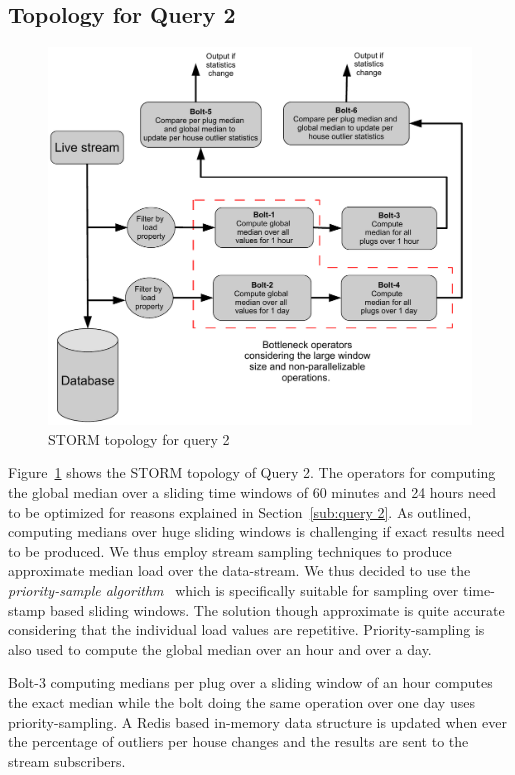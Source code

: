 \documentclass{sig-alternate}
\begin{document}
\subsection{Topology for Query 2}
\label{sub:q2-topology}  
\begin{figure}[htbp]
\includegraphics[scale=0.393]{query2.pdf}
\caption{STORM topology for query 2}
\label{fig:q2-topo}
\end{figure}

 Figure~\ref{fig:q2-topo} shows the STORM topology of Query 2. The operators for computing the global median over a sliding time windows of 60 minutes and 24 hours need to be optimized for reasons explained in Section~\ref{sub:query 2}.  As outlined, computing medians over huge sliding windows is challenging if exact results need to be produced. We thus employ stream sampling techniques to produce approximate median load over the data-stream. We thus decided to use the {\it priority-sample algorithm}~\cite{babcock2002sampling} which is specifically suitable for sampling over time-stamp based sliding windows. The solution though approximate is quite accurate considering that the individual load values are repetitive. Priority-sampling is also used to compute the global median over an hour and over a day. 
 
 Bolt-3 computing medians per plug over a sliding window of an hour computes the exact median while the bolt doing the same operation over one day uses priority-sampling. A Redis based in-memory data structure is updated when ever the percentage of outliers per house changes and the results are sent to the stream subscribers.
 
\end{document}
